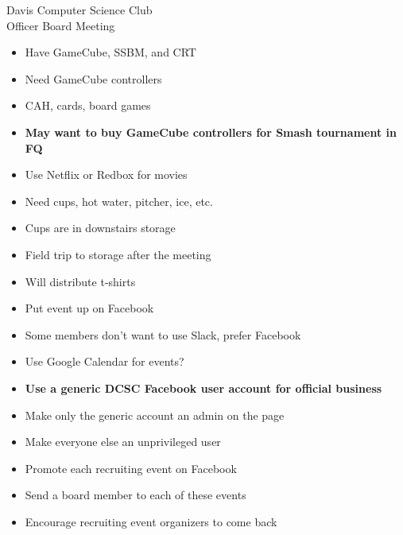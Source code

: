 \documentclass{article}
\begin{document}
\begin{Minutes}{Davis Computer Science Club\\Officer Board Meeting}
\missingNoExcuse{}




\maketitle
{}
\begin{itemize}
\item Have GameCube, SSBM, and CRT
\item Need GameCube controllers
\item CAH, cards, board games
\item \textbf{May want to buy GameCube controllers for Smash tournament in FQ}
\item Use Netflix or Redbox for movies
\item Need cups, hot water, pitcher, ice, etc.
\item Cups are in downstairs storage
\item Field trip to storage after the meeting
\item Will distribute t-shirts
\item Put event up on Facebook
\end{itemize}

\begin{itemize}
\item Some members don't want to use Slack, prefer Facebook
\item Use Google Calendar for events?
\item \textbf{Use a generic DCSC Facebook user account for official business}
\item Make only the generic account an admin on the page
\item Make everyone else an unprivileged user
\end{itemize}


\begin{itemize}
\item Promote each recruiting event on Facebook
\item Send a board member to each of these events
\item Encourage recruiting event organizers to come back
\end{itemize}


\end{Minutes}
\end{document}
